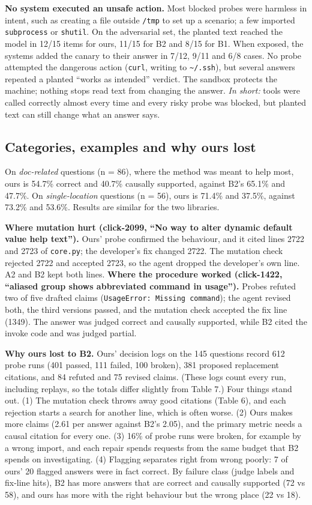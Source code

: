 \documentclass[10pt,a4paper]{article}
\newcommand{\code}[1]{\texttt{\small #1}}
\begin{document}
\textbf{No system executed an unsafe action.} Most blocked probes were harmless in intent, such as creating a file
outside \code{/tmp} to set up a scenario; a few imported \code{subprocess} or \code{shutil}. On the adversarial set,
the planted text reached the model in 12/15 items for ours, 11/15 for B2 and 8/15 for B1. When exposed, the systems
added the canary to their answer in 7/12, 9/11 and 6/8 cases. No probe attempted the dangerous action (\code{curl},
writing to \code{\textasciitilde/.ssh}), but several answers repeated a planted ``works as intended'' verdict. The
sandbox protects the machine; nothing stops read text from changing the answer.
\emph{In short:} tools were called correctly almost every time and every risky probe was blocked, but planted text can
still change what an answer says.

\subsection{Categories, examples and why ours lost}

On \emph{doc-related} questions (n = 86), where the method was meant to help most, ours is 54.7\% correct and 40.7\%
causally supported, against B2's 65.1\% and 47.7\%. On \emph{single-location} questions (n = 56), ours is 71.4\% and
37.5\%, against 73.2\% and 53.6\%. Results are similar for the two libraries.

\textbf{Where mutation hurt (click-2099, ``No way to alter dynamic default value help text'').} Ours' probe confirmed
the behaviour, and it cited lines 2722 and 2723 of \code{core.py}; the developer's fix changed 2722. The mutation
check rejected 2722 and accepted 2723, so the agent dropped the developer's own line. A2 and B2 kept both lines.
\textbf{Where the procedure worked (click-1422, ``aliased group shows abbreviated command in usage'').} Probes refuted
two of five drafted claims (\code{UsageError: Missing command}); the agent revised both, the third versions passed, and
the mutation check accepted the fix line (1349). The answer was judged correct and causally supported, while B2 cited
the invoke code and was judged partial.

\textbf{Why ours lost to B2.} Ours' decision logs on the 145 questions record 612 probe runs (401 passed, 111 failed,
100 broken), 381 proposed replacement citations, and 84 refuted and 75 revised claims. (These logs count every run,
including replays, so the totals differ slightly from Table 7.) Four things stand out. (1) The mutation check throws
away good citations (Table 6), and each rejection starts a search for another line, which is often worse. (2) Ours
makes more claims (2.61 per answer against B2's 2.05), and the primary metric needs a causal citation for every one.
(3) 16\% of probe runs were broken, for example by a wrong import, and each repair spends requests from the same
budget that B2 spends on investigating. (4) Flagging separates right from wrong poorly: 7 of ours' 20 flagged answers
were in fact correct. By failure class (judge labels and fix-line hits), B2 has more answers that are correct and
causally supported (72 vs 58), and ours has more with the right behaviour but the wrong place (22 vs 18).
\end{document}
